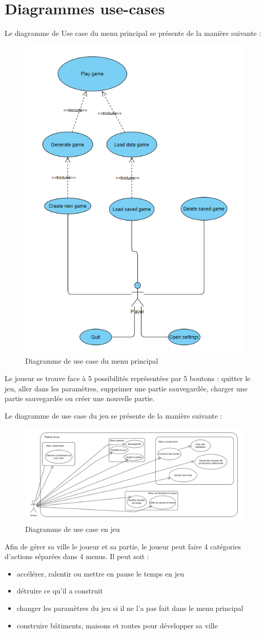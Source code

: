 \newpage
\section{Diagrammes use-cases}

Le diagramme de Use case du menu principal se présente de la manière suivante :
\begin{figure}[H]
    \centering
    \includegraphics[width=0.5\linewidth]{images/useCaseMenu.png}
    \caption{Diagramme de use case du menu principal}
    \label{fig:useCaseMenu}
\end{figure}
Le joueur se trouve face à 5 possibilités représentées par 5 boutons : quitter le jeu, aller dans les paramètres, supprimer une partie sauvegardée, charger une partie sauvegardée ou créer une nouvelle partie.
\pagebreak

Le diagramme de use case du jeu se présente de la manière suivante :
\begin{figure}[H]
    \centering
    \includegraphics[width=1\linewidth]{images/Use-cases-1.png}
    \caption{Diagramme de use case en jeu}
    \label{fig:useCaseEnJeu}
\end{figure}
Afin de gérer sa ville le joueur et sa partie, le joueur peut faire 4 catégories d'actions séparées dans 4 menus.
Il peut soit :
\begin{itemize}
    \item[\textbullet] accélérer, ralentir ou mettre en pause le temps en jeu
    \item[\textbullet] détruire ce qu'il a construit
    \item[\textbullet]changer les paramètres du jeu si il ne l'a pas fait dans le menu principal
    \item[\textbullet]construire bâtiments, maisons et routes pour développer sa ville
\end{itemize}